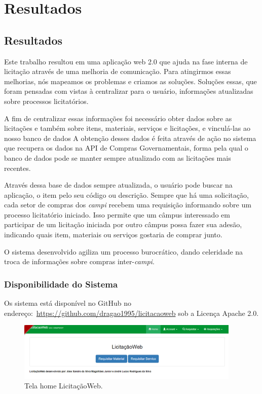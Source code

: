 \part{Resultados}

\chapter[Resultados]{Resultados}\label{Capitulo5}

Este trabalho resultou em uma aplicação web 2.0 que ajuda na fase interna de licitação através de uma melhoria de comunicação.
Para atingirmos essas melhorias, nós mapeamos os problemas e criamos as soluções.
Soluções essas, que foram pensadas com vistas à centralizar para o usuário, informações atualizadas sobre processos licitatórios.

A fim de centralizar essas informações foi necessário obter dados sobre as licitações e também sobre itens, materiais, serviços e licitações, e vinculá-las ao nosso banco de dados
A obtenção desses dados é feita através de ação no sistema que recupera os dados na API de Compras Governamentais, forma pela qual o banco de dados pode se manter sempre atualizado com as licitações mais recentes.

Através dessa base de dados sempre atualizada, o usuário pode buscar na aplicação, o item pelo seu código ou descrição.
Sempre que há uma solicitação, cada setor de compras dos \textit{campi} recebem uma requisição informando sobre um processo licitatório iniciado.
Isso permite que um câmpus interessado em participar de um licitação iniciada por outro câmpus possa fazer sua adesão, indicando quais item, materiais ou serviços gostaria de comprar junto.

O sistema desenvolvido agiliza um processo burocrático, dando celeridade na troca de informações sobre compras inter-\textit{campi}.


\section{Disponibilidade do Sistema}

Os sistema está disponível no GitHub no endereço:~\url{https://github.com/dragao1995/licitacaoweb} sob a Licença Apache 2.0.

\begin{figure}[htbp]
	\centering
	\includegraphics[width=0.95\textwidth]{figuras/prototipo001.png}
	\caption[Tela home LicitaçãoWeb]{Tela home LicitaçãoWeb.}
\end{figure}



